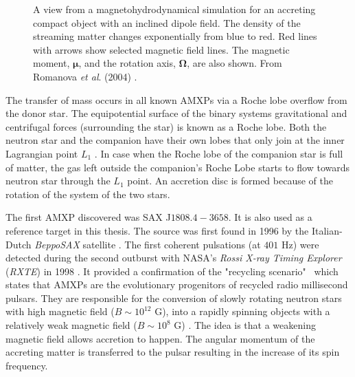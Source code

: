 \documentclass{wihuri}
\def\source{SAX J$1808.4-3658$}
\newcommand{\bmath}[1]{\boldsymbol{#1}}
\begin{document}
\begin{figure}
\centerline{} 
\caption{A view from a magnetohydrodynamical simulation for an accreting compact object with an inclined dipole field. The density of the streaming matter changes exponentially from blue to red. Red lines with arrows show selected magnetic field lines. The magnetic moment, $\bmath{\mu}$, and the rotation axis, $\bmath{\Omega}$, are also shown. From Romanova {\it et al}. (2004) \cite{romanova}.} 
\label{fig:shcematic}
\end{figure}

The transfer of mass occurs in all known AMXPs via a Roche lobe overflow from the donor star. The equipotential surface of the binary systems gravitational and centrifugal forces (surrounding the star) is known as a Roche lobe. Both the neutron star and the companion have their own lobes that only join at the inner Lagrangian point $L_{1}$ \cite{frank85}. %
In case when the Roche lobe of the companion star is full of matter, the gas left outside the companion's Roche Lobe starts to flow towards neutron star through the  $L_{1}$ point. An accretion disc is formed because of the rotation of the system of the two stars.
 

The first AMXP discovered was \source. It is also used as a reference target in this thesis. %
The source was first found in 1996 by the Italian-Dutch {\it BeppoSAX} satellite \cite{zandsax1808}. %
The first coherent pulsations (at $401$ Hz) were detected during the second outburst with NASA's {\it Rossi X-ray Timing Explorer} ({\it RXTE}) in 1998 \cite{wijnandssax1808}. %
It provided a confirmation of the "recycling scenario" \ which states that AMXPs are the evolutionary progenitors of recycled radio millisecond pulsars. They are responsible for the conversion of slowly rotating neutron stars with high magnetic field ($B \sim 10^{12}$ G), into a rapidly spinning objects with a relatively weak magnetic field ($B \sim 10^{8}$ G) \cite{patruno}. The idea is that a weakening magnetic field allows accretion to happen. The angular momentum of the accreting matter is transferred to the pulsar resulting in the increase of its spin frequency.%
\end{document}
